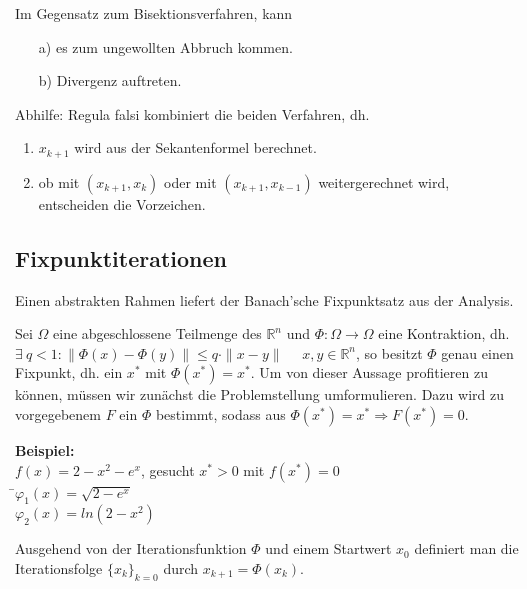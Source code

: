 \begin{bemerkung}
Im Gegensatz zum Bisektionsverfahren, kann
\begin{enumerate}
\item[a)] es zum ungewollten Abbruch kommen.
\item[b)] Divergenz auftreten.
\end{enumerate}

Abhilfe: Regula falsi kombiniert die beiden Verfahren, dh.
\begin{enumerate}
\item  $x_{k+1}$ wird aus der Sekantenformel berechnet.
\item  ob mit $(x_{k+1},x_k)$ oder mit $(x_{k+1},x_{k-1})$ weitergerechnet wird, entscheiden die Vorzeichen.
\end{enumerate}
\end{bemerkung}


\subsection{Fixpunktiterationen}

Einen abstrakten Rahmen liefert der Banach'sche Fixpunktsatz aus der Analysis.
\newline

\noindent Sei $\Omega$ eine abgeschlossene Teilmenge des $\mathbb{R}^n$ und $\Phi: \Omega
\longrightarrow \Omega$ eine Kontraktion, dh. $\exists \ q<1: \| \Phi(x) -
\Phi(y)\| \leq q\cdot \|x-y\|$ \ \ $x,y \in \mathbb{R}^n$, so besitzt $\Phi$
genau einen Fixpunkt, dh. ein $x^*$ mit $\Phi(x^*)=x^*$.  Um von dieser Aussage
profitieren zu können, müssen wir zunächst die Problemstellung umformulieren.
Dazu wird zu vorgegebenem $F$ ein $\Phi$ bestimmt, sodass aus $\Phi(x^*)=x^*
\Rightarrow F(x^*)=0$.

\begin{tabbing}
\textbf{Beispiel:}
\\$f(x)=2-x^2-e^x$, gesucht $x^*>0$ mit $f(x^*)=0$\\
\hspace*{8mm} \=$\varphi_1(x)=\sqrt{2-e^x}$\\
\>$\varphi_2(x)=ln(2-x^2)$\\
\end{tabbing}

\begin{definition} [Fixpunktiteration]
Ausgehend von der Iterationsfunktion $\Phi$ und einem Startwert $x_0$ definiert man die Iterationsfolge $\{x_k\}_{k=0}$ durch $x_{k+1}=\Phi(x_k)$.\\
\end{definition}


